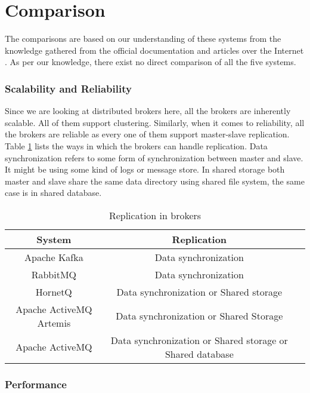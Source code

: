 \section{Comparison}

The comparisons are based on our understanding of these systems from the knowledge gathered from the official documentation and articles over the Internet \parencite{broker_compr} \parencite{eriksson2016comparing} \parencite{broker_performance} \parencite{broker_explore} \parencite{broker_mq}. As per our knowledge, there exist no direct comparison of all the five systems.

\subsubsection{Scalability and Reliability}

Since we are looking at distributed brokers here, all the brokers are inherently scalable. All of them support clustering. Similarly, when it comes to reliability, all the brokers are reliable as every one of them support master-slave replication. Table \ref{table:comparison} lists the ways in which the brokers can handle replication. Data synchronization refers to some form of synchronization between master and slave. It might be using some kind of logs or message store. In shared storage both master and slave share the same data directory using shared file system, the same case is in shared database.

\begin{table}[h]
  \centering
  \caption{Replication in brokers}
  \label{table:comparison}
  \begin{tabular}{ccc}
    \toprule
    System & Replication\\
    \midrule
    Apache Kafka & Data synchronization\\
    RabbitMQ & Data synchronization \\
    HornetQ & Data synchronization or Shared storage \\
    Apache ActiveMQ Artemis & Data synchronization or Shared Storage\\
    Apache ActiveMQ & Data synchronization or Shared storage or Shared database\\
    \bottomrule
  \end{tabular}
\end{table} 

\subsubsection{Performance}

